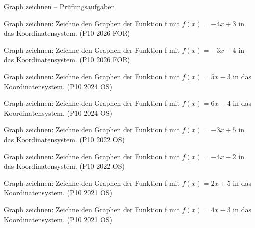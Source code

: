 \begin{aufgabe}{Graph zeichnen – Prüfungsaufgaben}
\begin{teile}
\teil Graph zeichnen: Zeichne den Graphen der Funktion f mit $f(x) = -4x + 3$ in das Koordinatensystem. \hfill (P10 2026 FOR)

\begin{ksys}[xmin=-4,xmax=4,ymin=-4,ymax=4] \end{ksys}
\teil Graph zeichnen: Zeichne den Graphen der Funktion f mit $f(x) = -3x - 4$ in das Koordinatensystem. \hfill (P10 2026 FOR)

\begin{ksys}[xmin=-4,xmax=4,ymin=-8,ymax=4] \end{ksys}
\teil Graph zeichnen: Zeichne den Graphen der Funktion f mit $f(x) = 5x - 3$ in das Koordinatensystem. \hfill (P10 2024 OS)

\begin{ksys}[xmin=-4,xmax=4,ymin=-4,ymax=4] \end{ksys}
\teil Graph zeichnen: Zeichne den Graphen der Funktion f mit $f(x) = 6x - 4$ in das Koordinatensystem. \hfill (P10 2024 OS)

\begin{ksys}[xmin=-4,xmax=4,ymin=-5,ymax=4] \end{ksys}
\teil Graph zeichnen: Zeichne den Graphen der Funktion f mit $f(x) = -3x + 5$ in das Koordinatensystem. \hfill (P10 2022 OS)

\begin{ksys}[xmin=-4,xmax=4,ymin=-4,ymax=6] \end{ksys}
\teil Graph zeichnen: Zeichne den Graphen der Funktion f mit $f(x) = -4x - 2$ in das Koordinatensystem. \hfill (P10 2022 OS)

\begin{ksys}[xmin=-4,xmax=4,ymin=-7,ymax=4] \end{ksys}
\teil Graph zeichnen: Zeichne den Graphen der Funktion f mit $f(x) = 2x + 5$ in das Koordinatensystem. \hfill (P10 2021 OS)

\begin{ksys}[xmin=-4,xmax=4,ymin=-4,ymax=8] \end{ksys}
\teil Graph zeichnen: Zeichne den Graphen der Funktion f mit $f(x) = 4x - 3$ in das Koordinatensystem. \hfill (P10 2021 OS)

\begin{ksys}[xmin=-4,xmax=4,ymin=-4,ymax=4] \end{ksys}
\end{teile}
\end{aufgabe}


